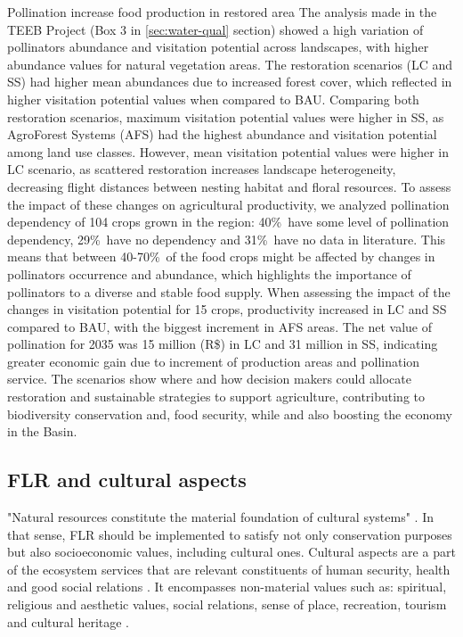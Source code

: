 \begin{mybox}{Pollination increase food production in restored area}\label{Box4}
The analysis made in the TEEB Project (Box 3 in \ref{sec:water-qual} section) showed a high variation of pollinators abundance and visitation potential across landscapes, with higher abundance values for natural vegetation areas. The restoration scenarios (LC and SS) had higher mean abundances due to increased forest cover, which reflected in higher visitation potential values when compared to BAU. Comparing both restoration scenarios, maximum visitation potential values were higher in SS, as AgroForest Systems (AFS) had the highest abundance and visitation potential among land use classes. However, mean visitation potential values were higher in LC scenario, as scattered restoration increases landscape heterogeneity, decreasing flight distances between nesting habitat and floral resources. To assess the impact of these changes on agricultural productivity, we analyzed pollination dependency of 104 crops grown in the region: 40\%\ have some level of pollination dependency, 29\%\ have no dependency and 31\%\ have no data in literature. This means that between 40-70\%\ of the food crops might be affected by changes in pollinators occurrence and abundance, which highlights the importance of pollinators to a diverse and stable food supply.  When assessing the impact of the changes in visitation potential for 15 crops, productivity increased in LC and SS compared to BAU, with the biggest increment in AFS areas. The net value of pollination for 2035 was 15 million (R\$) in LC and 31 million in SS, indicating greater economic gain due to increment of production areas and pollination service. The scenarios show where and how decision makers could allocate restoration and sustainable strategies to support agriculture, contributing to biodiversity conservation and, food security, while and also boosting the economy in the Basin.
\end{mybox}

\subsection{\large FLR and cultural aspects} \label{subsec:socio-cult}

"Natural resources constitute the material foundation of cultural systems" \citep{Wehi2017}. In that sense, FLR should be implemented to satisfy not only conservation purposes but also socioeconomic values, including cultural ones. Cultural aspects are a part of the ecosystem services that are relevant constituents of human security, health and good social relations \citep{Arico2001}. It encompasses non-material values such as: spiritual, religious and aesthetic values, social relations, sense of place, recreation, tourism and cultural heritage \citep{Arico2001,Daniel2012}. 


